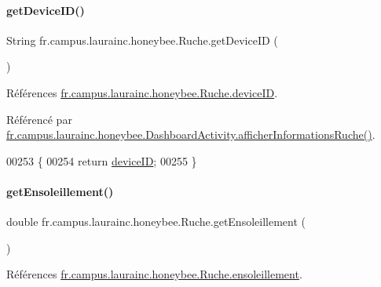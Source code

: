 \paragraph{\texorpdfstring{get\+Device\+I\+D()}{getDeviceID()}}
{\footnotesize\ttfamily String fr.\+campus.\+laurainc.\+honeybee.\+Ruche.\+get\+Device\+ID (\begin{DoxyParamCaption}{ }\end{DoxyParamCaption})}



Références \hyperlink{classfr_1_1campus_1_1laurainc_1_1honeybee_1_1_ruche_aa9f9b410923f3c8b037c2c359a67a132}{fr.\+campus.\+laurainc.\+honeybee.\+Ruche.\+device\+ID}.



Référencé par \hyperlink{classfr_1_1campus_1_1laurainc_1_1honeybee_1_1_dashboard_activity_a88f00531bee33bd6c47b33f5ac4df9ed}{fr.\+campus.\+laurainc.\+honeybee.\+Dashboard\+Activity.\+afficher\+Informations\+Ruche()}.


\begin{DoxyCode}
00253                                 \{
00254         \textcolor{keywordflow}{return} \hyperlink{classfr_1_1campus_1_1laurainc_1_1honeybee_1_1_ruche_aa9f9b410923f3c8b037c2c359a67a132}{deviceID};
00255     \}
\end{DoxyCode}
\mbox{\label{classfr_1_1campus_1_1laurainc_1_1honeybee_1_1_ruche_a18a40461d368f06fd0532bfa1b63b868}} 
\paragraph{\texorpdfstring{get\+Ensoleillement()}{getEnsoleillement()}}
{\footnotesize\ttfamily double fr.\+campus.\+laurainc.\+honeybee.\+Ruche.\+get\+Ensoleillement (\begin{DoxyParamCaption}{ }\end{DoxyParamCaption})}



Références \hyperlink{classfr_1_1campus_1_1laurainc_1_1honeybee_1_1_ruche_aebfc51ed0e12be0dddc7675884a8129b}{fr.\+campus.\+laurainc.\+honeybee.\+Ruche.\+ensoleillement}.



